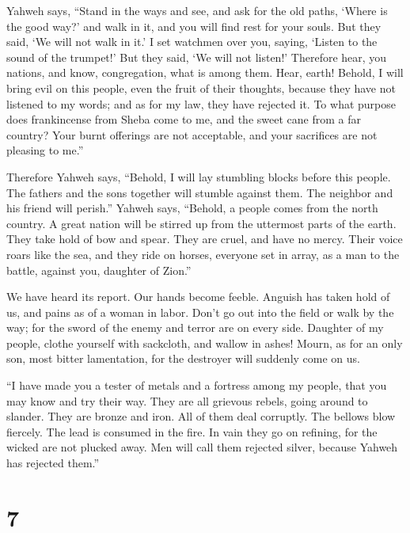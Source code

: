  Yahweh says, ``Stand in the ways and see, and ask for
the old paths, `Where is the good way?' and walk in it, and you will
find rest for your souls. But they said, `We will not walk in it.'
 I set watchmen over you, saying, `Listen to the sound of
the trumpet!' But they said, `We will not listen!' 
Therefore hear, you nations, and know, congregation, what is among them.
 Hear, earth! Behold, I will bring evil on this people,
even the fruit of their thoughts, because they have not listened to my
words; and as for my law, they have rejected it.  To what
purpose does frankincense from Sheba come to me, and the sweet cane from
a far country? Your burnt offerings are not acceptable, and your
sacrifices are not pleasing to me.''

 Therefore Yahweh says, ``Behold, I will lay stumbling
blocks before this people. The fathers and the sons together will
stumble against them. The neighbor and his friend will perish.''
 Yahweh says, ``Behold, a people comes from the north
country. A great nation will be stirred up from the uttermost parts of
the earth.  They take hold of bow and spear. They are
cruel, and have no mercy. Their voice roars like the sea, and they ride
on horses, everyone set in array, as a man to the battle, against you,
daughter of Zion.''

 We have heard its report. Our hands become feeble.
Anguish has taken hold of us, and pains as of a woman in labor.
 Don't go out into the field or walk by the way; for the
sword of the enemy and terror are on every side. 
Daughter of my people, clothe yourself with sackcloth, and wallow in
ashes! Mourn, as for an only son, most bitter lamentation, for the
destroyer will suddenly come on us.

 ``I have made you a tester of metals and a fortress
among my people, that you may know and try their way. 
They are all grievous rebels, going around to slander. They are bronze
and iron. All of them deal corruptly.  The bellows blow
fiercely. The lead is consumed in the fire. In vain they go on refining,
for the wicked are not plucked away.  Men will call them
rejected silver, because Yahweh has rejected them.''

\hypertarget{section-6}{%
\section{7}\label{section-6}}

